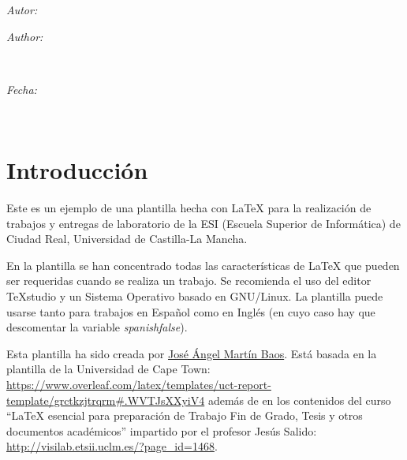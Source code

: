 \documentclass[11pt]{article}
\makeatletter
\newif\ifspanish %
\newif\ifmultipleauthors %
\newcommand{\dateText}{Fecha:}
\newcommand{\dateText}{Date:}
\let\theauthor\@author
\let\thedate\@date
\makeatother
\begin{document}
\begin{titlepage}
	\vspace*{\fill}
	\begin{minipage}{0.4\textwidth}
		\begin{flushleft} \large
			\ifspanish
				\ifmultipleauthors
					\emph{Autores:}\\
				\else
					\emph{Autor:}\\
				\fi
			\else
				\ifmultipleauthors
					\emph{Authors:}\\
				\else
					\emph{Author:}\\
				\fi
			\fi
			\theauthor
			\end{flushleft}
			\end{minipage}~
			\begin{minipage}{0.4\textwidth}
			\begin{flushright} \large
			\emph{\dateText} \\
			\thedate
		\end{flushright}
	\end{minipage}\\[2.25 cm]


\end{titlepage}


\tableofcontents
\pagebreak



\section{Introducción}
Este es un ejemplo de una plantilla hecha con \LaTeX{} para la realización de trabajos y entregas de laboratorio de la ESI (Escuela Superior de Informática) de Ciudad Real, Universidad de Castilla-La Mancha.

En la plantilla se han concentrado todas las características de \LaTeX{} que pueden ser requeridas cuando se realiza un trabajo. Se recomienda el uso del editor TeXstudio y un Sistema Operativo basado en GNU/Linux. La plantilla puede usarse tanto para trabajos en Español como en Inglés (en cuyo caso hay que descomentar la variable \emph{spanishfalse}).

Esta plantilla ha sido creada por \href{https://github.com/JoseAngelMartinB}{José Ángel Martín Baos}. Está basada en la plantilla de la Universidad de Cape Town: \url{https://www.overleaf.com/latex/templates/uct-report-template/grctkzjtrqrm#.WVTJsXXyiV4} además de en los contenidos del curso “\LaTeX{} esencial para preparación de Trabajo Fin de Grado, Tesis y otros documentos académicos” impartido por el profesor Jesús Salido: \url{http://visilab.etsii.uclm.es/?page_id=1468}.
\end{document}
